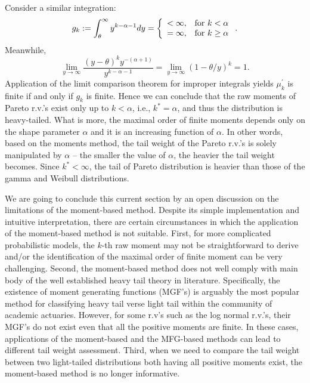 \documentclass[]{book}
\theoremstyle{definition}
\theoremstyle{definition}
\theoremstyle{definition}
\theoremstyle{remark}
\begin{document}
Consider a similar integration: \[\begin{aligned}
  g_k:=\int_{\theta}^{\infty} {y^{k-\alpha-1}} dy=\left\{
  \begin{array}{ll}
    <\infty, & \hbox{for } k<\alpha\\
    =\infty, & \hbox{for } k\geq \alpha
  \end{array}
\right. .\end{aligned}\] Meanwhile,
\[\lim_{y\rightarrow \infty} \frac{(y-\theta)^k {y^{-(\alpha+1)}}}{y^{k-\alpha-1}}=\lim_{y\rightarrow \infty}
(1-\theta/y)^{k}=1.\] Application of the limit comparison theorem for
improper integrals yields \(\mu_k^{'}\) is finite if and only if \(g_k\)
is finite. Hence we can conclude that the raw moments of Pareto r.v.'s
exist only up to \(k<\alpha\), i.e., \(k^{\ast}=\alpha\), and thus the
distribution is heavy-tailed. What is more, the maximal order of finite
moments depends only on the shape parameter \(\alpha\) and it is an
increasing function of \(\alpha\). In other words, based on the moments
method, the tail weight of the Pareto r.v.'s is solely manipulated by
\(\alpha\) -- the smaller the value of \(\alpha\), the heavier the tail
weight becomes. Since \(k^{\ast}<\infty\), the tail of Pareto
distribution is heavier than those of the gamma and Weibull
distributions.

We are going to conclude this current section by an open discussion on
the limitations of the moment-based method. Despite its simple
implementation and intuitive interpretation, there are certain
circumstances in which the application of the moment-based method is not
suitable. First, for more complicated probabilistic models, the \(k\)-th
raw moment may not be straightforward to derive and/or the
identification of the maximal order of finite moment can be very
challenging. Second, the moment-based method does not well comply with
main body of the well established heavy tail theory in literature.
Specifically, the existence of moment generating functions (MGF's) is
arguably the most popular method for classifying heavy tail verse light
tail within the community of academic actuaries. However, for some r.v's
such as the log normal r.v.'s, their MGF's do not exist even that all
the positive moments are finite. In these cases, applications of the
moment-based and the MFG-based methods can lead to different tail weight
assessment. Third, when we need to compare the tail weight between two
light-tailed distributions both having all positive moments exist, the
moment-based method is no longer informative.
\end{document}
